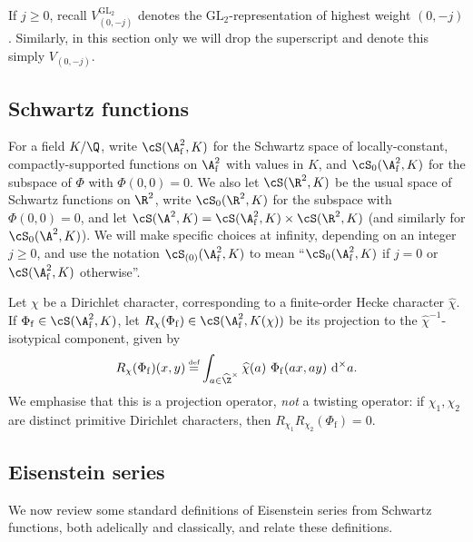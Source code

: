 \documentclass[10pt,reqno,a4paper]{amsart}
\newcommand{\Phif}{{\Phi\subf}}
\newcommand{\chihat}{\widehat{\chi}}
\newcommand{\subf}{_{\mathrm{f}}}
\newcommand{\GL}{\mathrm{GL}}
\begin{document}
If $j\geq 0$, recall $V_{(0,-j)}^{\GL_2}$ denotes the $\GL_2$-representation of highest weight $(0, -j)$. Similarly, in this section only we will drop the superscript and denote this simply $V_{(0,-j)}$.

\subsection{Schwartz functions}\label{sec:schwartz}

For a field $K/\Q$, write $\cS(\A\subf^2,K)$ for the Schwartz space of locally-constant, compactly-supported functions on $\A\subf^2$ with values in $K$, and $\cS_0(\A\subf^2, K)$ for the subspace of $\Phi$ with $\Phi(0, 0) = 0$. We also let $\cS(\R^2,K)$ be the usual space of Schwartz functions on $\R^2$, write $\cS_0(\R^2,K)$ for the subspace with $\Phi(0,0) = 0$, and let $\cS(\A^2,K) = \cS(\A\subf^2,K) \times \cS(\R^2,K)$ (and similarly for $\cS_0(\A^2,K)$).  We will make specific choices at infinity, depending on an integer $j\geq 0$, and use the notation $\cS_{(0)}(\A\subf^2, K)$ to mean ``$\cS_{0}(\A\subf^2, K)$ if $j = 0$ or $\cS(\A\subf^2, K)$ otherwise''.

Let $\chi$ be a Dirichlet character, corresponding to a finite-order Hecke character $\chihat$. If $\Phif \in \cS(\A\subf^2,K)$, let $R_\chi(\Phif) \in \cS(\A\subf^2,K(\chi))$ be its projection to the $\chihat^{-1}$-isotypical component, given by
\begin{equation}\label{eq:R_chi}
R_{\chi}(\Phif)(x,y) \defeq \int_{a \in \widehat{\Z}^\times} \chihat(a)\  \Phif(ax,ay)\  \mathrm{d}^\times a.
\end{equation}
We emphasise that this is a projection operator, \emph{not} a twisting operator: if $\chi_1,\chi_2$ are distinct primitive Dirichlet characters, then $R_{\chi_1} R_{\chi_2} (\Phif) = 0$.



\subsection{Eisenstein series}\label{sec:eisenstein series}
We now review some standard definitions of Eisenstein series from Schwartz functions, both adelically and classically, and relate these definitions.
\end{document}
